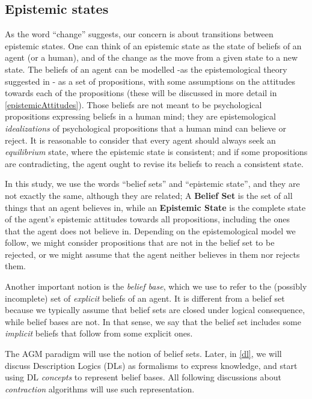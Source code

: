 \subsection{Epistemic states}
As the word ``change'' suggests, our concern is about transitions between epistemic states. One can think of an epistemic state as the state of beliefs of an agent (or a human), and of the change as the move from a given state to a new state. The beliefs of an agent can be modelled -as the epistemological theory suggested in \cite{flux}- as a set of propositions, with some assumptions on the attitudes towards each of the propositions (these will be discussed in more detail in \ref{epistemicAttitudes}). Those beliefs are not meant to be psychological propositions expressing beliefs in a human mind; they are epistemological \textit{idealizations} of psychological propositions that a human mind can believe or reject. It is reasonable to consider that every agent should always seek an \textit{equilibrium} state, where the epistemic state is consistent; and if some propositions are contradicting, the agent ought to revise its beliefs to reach a consistent state. 

In this study, we use the words ``belief sets'' and ``epistemic state'', and they are not exactly the same, although they are related; A \textbf{Belief Set} is the set of all things that an agent believes in, while an \textbf{Epistemic State} is the complete state of the agent's epistemic attitudes towards all propositions, including the ones that the agent does not believe in. Depending on the epistemological model we follow, we might consider propositions that are not in the belief set to be rejected, or we might assume that the agent neither believes in them nor rejects them. 

Another important notion is the \textit{belief base}, which we use to refer to the (possibly incomplete) set of \textit{explicit} beliefs of an agent. It is different from a belief set because we typically assume that belief sets are closed under logical consequence, while belief bases are not. In that sense, we say that the belief set includes some \textit{implicit} beliefs that follow from some explicit ones.

The AGM paradigm will use the notion of belief sets. Later, in \ref{dl}, we will discuss Description Logics (DLs) as formalisms to express knowledge, and start using DL \textit{concepts} to represent belief bases. All following discussions about \textit{contraction} algorithms will use such representation.


